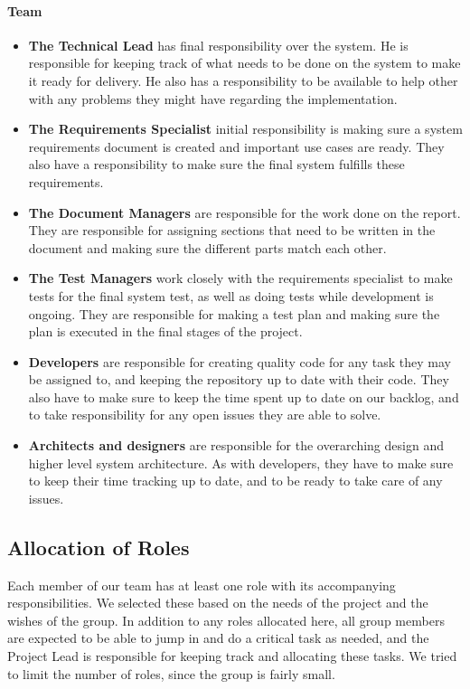 \paragraph{Team}
\begin{itemize}
    \item \textbf{The Technical Lead} has  final responsibility over the system. He is responsible for keeping track of what needs to be done on the system to make it ready for delivery. He also has a responsibility to be available to help other with any problems they might have regarding the implementation.
    \item \textbf{The Requirements Specialist} initial responsibility is making sure a system requirements document is created and important use cases are ready. They also have a responsibility to make sure the final system fulfills these requirements.
    \item \textbf{The Document Managers} are responsible for the work done on the report. They are responsible for assigning sections that need to be written in the document and making sure the different parts match each other.
    \item \textbf{The Test Managers} work closely with the requirements specialist to make tests for the final system test, as well as doing tests while development is ongoing. They are responsible for making a test plan and making sure the plan is executed in the final stages of the project.
    \item \textbf{Developers} are responsible for creating quality code for any task they may be assigned to, and keeping the repository up to date with their code. They also have to make sure to keep the time spent up to date on our backlog, and to take responsibility for any open issues they are able to solve.
    \item \textbf{Architects and designers} are responsible for the overarching design and higher level system architecture. As with developers, they have to make sure to keep their time tracking up to date, and to be ready to take care of any issues.
\end{itemize}

\subsection{Allocation of Roles}
\label{subsec:PlanningGroupOrgAllocation}
Each member of our team has at least one role with its accompanying responsibilities. We selected these based on the needs of the project and the wishes of the group. In addition to any roles allocated here, all group members are expected to be able to jump in and do a critical task as needed, and the Project Lead is responsible for keeping track and allocating these tasks. We tried to limit the number of roles, since the group is fairly small.

